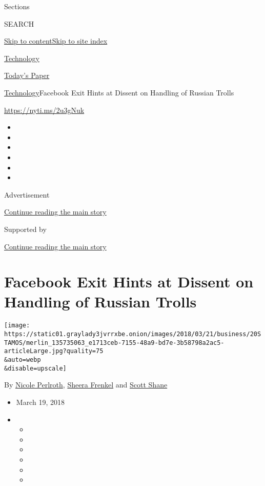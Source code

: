 Sections

SEARCH

\protect\hyperlink{site-content}{Skip to
content}\protect\hyperlink{site-index}{Skip to site index}

\href{https://www.nytimes3xbfgragh.onion/section/technology}{Technology}

\href{https://myaccount.nytimes3xbfgragh.onion/auth/login?response_type=cookie\&client_id=vi}{}

\href{https://www.nytimes3xbfgragh.onion/section/todayspaper}{Today's
Paper}

\href{/section/technology}{Technology}\textbar{}Facebook Exit Hints at
Dissent on Handling of Russian Trolls

\url{https://nyti.ms/2u3gNuk}

\begin{itemize}
\item
\item
\item
\item
\item
\item
\end{itemize}

Advertisement

\protect\hyperlink{after-top}{Continue reading the main story}

Supported by

\protect\hyperlink{after-sponsor}{Continue reading the main story}

\hypertarget{facebook-exit-hints-at-dissent-on-handling-of-russian-trolls}{%
\section{Facebook Exit Hints at Dissent on Handling of Russian
Trolls}\label{facebook-exit-hints-at-dissent-on-handling-of-russian-trolls}}

\texttt{[image: https://static01.graylady3jvrrxbe.onion/images/2018/03/21/business/20STAMOS/merlin\_135735063\_e1713ceb-7155-48a9-bd7e-3b58798a2ac5-articleLarge.jpg?quality=75\\\&auto=webp\\\&disable=upscale]}

By \href{https://www.nytimes3xbfgragh.onion/by/nicole-perlroth}{Nicole
Perlroth},
\href{https://www.nytimes3xbfgragh.onion/by/sheera-frenkel}{Sheera
Frenkel} and
\href{https://www.nytimes3xbfgragh.onion/by/scott-shane}{Scott Shane}

\begin{itemize}
\item
  March 19, 2018
\item
  \begin{itemize}
  \item
  \item
  \item
  \item
  \item
  \item
  \end{itemize}
\end{itemize}

